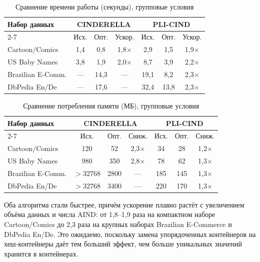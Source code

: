 \begin{table}[h]
\centering
\caption{Сравнение времени работы (секунды), групповые условия}
\label{tab:time_comparison}
\begin{tabular}{|l|c|c|c|c|c|c|}
\hline
\multirow{}{}{Набор данных} & \multicolumn{3}{c|}{CINDERELLA} & \multicolumn{3}{c|}{PLI-CIND} \\
\cline{2-7}
& Исх. & Опт. & Ускор. & Исх. & Опт. & Ускор. \\
\hline
Cartoon/Comics & 1{,}4 & 0{,}8 & 1{,}8$\times$ & 2{,}9 & 1{,}5 & 1{,}9$\times$ \\
US Baby Names & 3{,}8 & 1{,}9 & 2{,}0$\times$ & 8{,}7 & 3{,}9 & 2{,}2$\times$ \\
Brazilian E-Comm. & --- & 14{,}3 & --- & 19{,}1 & 8{,}2 & 2{,}3$\times$ \\
DbPedia En/De & --- & 17{,}6 & --- & 32{,}4 & 13{,}8 & 2{,}3$\times$ \\
\hline
\end{tabular}
\end{table}

\begin{table}[h]
\centering
\caption{Сравнение потребления памяти (МБ), групповые условия}
\label{tab:memory_comparison}
\begin{tabular}{|l|c|c|c|c|c|c|}
\hline
\multirow{}{}{Набор данных} & \multicolumn{3}{c|}{CINDERELLA} & \multicolumn{3}{c|}{PLI-CIND} \\
\cline{2-7}
& Исх. & Опт. & Сниж. & Исх. & Опт. & Сниж. \\
\hline
Cartoon/Comics & 120 & 52 & 2{,}3$\times$ & 34 & 28 & 1{,}2$\times$ \\
US Baby Names & 980 & 350 & 2{,}8$\times$ & 78 & 62 & 1{,}3$\times$ \\
Brazilian E-Comm. & $>$32768 & 2800 & --- & 185 & 145 & 1{,}3$\times$ \\
DbPedia En/De & $>$32768 & 3400 & --- & 220 & 170 & 1{,}3$\times$ \\
\hline
\end{tabular}
\end{table}

Оба алгоритма стали быстрее, причём ускорение плавно растёт с увеличением объёма данных и числа AIND: от 1{,}8--1{,}9 раза на компактном наборе Cartoon/Comics до 2{,}3 раза на крупных наборах Brazilian E-Commerce и DbPedia En/De. Это ожидаемо, поскольку замена упорядоченных контейнеров на хеш-контейнеры даёт тем больший эффект, чем больше уникальных значений хранится в контейнерах.

